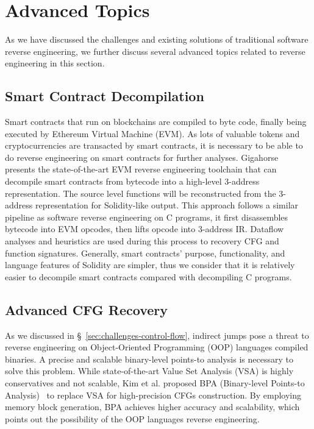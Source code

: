\chapter{Advanced Topics}\label{sec-advanced}
As we have discussed the challenges and existing solutions of traditional software reverse engineering, we further discuss several advanced topics related to reverse engineering in this section.

\section{Smart Contract Decompilation}\label{sec:advanced-contract}
Smart contracts that run on blockchains are compiled to byte code, finally being executed by Ethereum Virtual Machine (EVM). As lots of valuable tokens and cryptocurrencies are transacted by smart contracts, it is necessary to be able to do reverse engineering on smart contracts for further analyses. Gigahorse~\cite{grech2019gigahorse} presents the state-of-the-art EVM reverse engineering toolchain that can decompile smart contracts from bytecode into a high-level 3-address representation. The source level functions will be reconstructed from the 3-address representation for Solidity-like output. This approach follows a similar pipeline as software reverse engineering on C programs, it first disassembles bytecode into EVM opcodes, then lifts opcode into 3-address IR. Dataflow analyses and heuristics are used during this process to recovery CFG and function signatures.  Generally, smart contracts' purpose, functionality, and language features of Solidity are simpler, thus we consider that it is relatively easier to decompile smart contracts compared with decompiling C programs.


\section{Advanced CFG Recovery}\label{sec:advanced-cfg}
As we discussed in \S~\ref{sec:challenges-control-flow}, indirect jumps pose a threat to reverse engineering on Object-Oriented Programming (OOP) languages compiled binaries. A precise and scalable binary-level points-to analysis is necessary to solve this problem. While state-of-the-art Value Set Analysis (VSA) is highly conservatives and not scalable, Kim et al. proposed BPA (Binary-level Points-to Analysis)~\cite{kim2021refining} to replace VSA for high-precision CFGs construction. By employing memory block generation, BPA achieves higher accuracy and scalability, which points out the possibility of the OOP languages reverse engineering.


